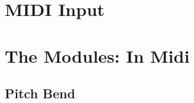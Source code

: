 \section{MIDI Input}\label{section:midi-input}

\section{The Modules: In Midi}\label{section:the-modules-midi}

\subsection{Pitch Bend}